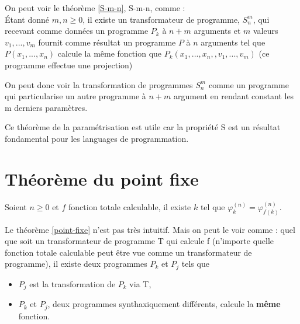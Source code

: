 \begin{myrem}
	On peut voir le théorème \ref{S-m-n}, S-m-n, comme : \\
	Étant donné $m,n \geq 0$, il existe un transformateur de programme, $S^m_n$, qui recevant comme
	données un programme $P_k$ à $n+m$ arguments et $m$ valeurs $v_1,...,v_m$
	fournit comme résultat un programme $P$ à $n$ arguments tel que
	$P(x_1,...,x_n)$ calcule la même fonction que
	$P_k(x_1,...,x_n,,v_1,...,v_m)$ (ce programme effectue une projection)
\end{myrem}

\begin{myrem}
	On peut donc voir la transformation de programmes $S^m_n$ comme un
	programme qui particularise un autre programme à $n+m$ argument en rendant
	constant les m derniers paramètres.
\end{myrem}

\begin{myrem}
	Ce théorème de la paramétrisation est utile car la propriété S est un résultat fondamental pour les languages de programmation.
\end{myrem}

\section{Théorème du point fixe}
\label{sec:th_or_me_du_point_fixe}
\begin{mytheo}
	\label{point-fixe}
    Soient $n \geq 0$ et $f$ fonction totale
	calculable, il existe $k$ tel que $\varphi^{(n)}_k = \varphi^{(n)}_{f(k)}$.
\end{mytheo}

\begin{myrem}
	Le théorème \ref{point-fixe} n'est pas très intuitif. Mais on peut le
	voir comme : quel que soit un transformateur de programme T qui calcule f (n'importe quelle fonction totale calculable peut être vue comme un transformateur	de programme),
	il existe deux programmes $P_k$ et $P_j$ tels que
	\begin{itemize}
		\item $P_j$ est la transformation de $P_k$ via T,
		\item $P_k$ et $P_j$, deux programmes synthaxiquement différents, calcule la \textbf{même} fonction.
	\end{itemize}
\end{myrem}

